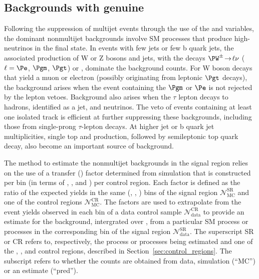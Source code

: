 \subsection{Backgrounds with genuine \texorpdfstring{\ETmiss}{MET}}
\label{sec:ewk_background}

Following the suppression of multijet events through the use of the
\alphat and \bdphi variables, the dominant nonmultijet backgrounds
involve SM processes that produce high-\Pt neutrinos in the final
state. In events with few jets or few b quark jets, the associated
production of W or Z bosons and jets, with the decays $\PW^\pm
\!\rightarrow\! \ell\nu$ ($\ell=\Pe$, $\Pgm$, $\Pgt$) or \znunu,
dominate the background counts. For W boson decays that yield a muon
or electron (possibly originating from leptonic $\Pgt$ decays), the
background arises when the event containing the $\Pgm$ or $\Pe$ is not
rejected by the lepton vetoes. Background also arises when the $\tau$
lepton decays to hadrons, identified as a jet, and neutrinos. The veto
of events containing at least one isolated track is efficient at
further suppressing these backgrounds, including those from
single-prong $\tau$-lepton decays. At higher jet or b quark jet
multiplicities, single top and \ttbar production, followed by
semileptonic top quark decay, also become an important source of
background.

The method to estimate the nonmultijet backgrounds in the signal
region relies on the use of a transfer (\tf) factor determined from
simulation that is constructed per bin (in terms of \njet, \nb, and
\scalht) per control region. Each \tf factor is defined as the ratio
of the expected yields in the same (\njet, \nb, \scalht) bins of the
signal region $\mathcal{N}^\text{SR}_\text{MC}$ and one of the control
regions $\mathcal{N}^\text{CR}_\text{MC}$. The \tf factors are used to
extrapolate from the event yields observed in each bin of a data
control sample $\mathcal{N}^\text{CR}_\text{data}$ to provide an
estimate for the background, intergrated over \HTmiss, from a
particular SM process or processes in the corresponding bin of the
signal region $\mathcal{N}^\text{SR}_\text{data}$. The superscript SR
or CR refers to, respectively, the process or processes being
estimated and one of the \mj, \mmj, and \gj control regions, described
in Section~\ref{sec:control_regions}. The subscript refers to whether
the counts are obtained from data, simulation (``MC'') or an estimate
(``pred'').

